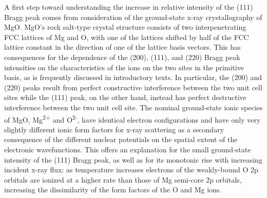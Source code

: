 A first step toward understanding the increase in relative intensity of
the (111) Bragg peak comes from consideration of the ground-state x-ray
crystallography of MgO. MgO's rock salt-type crystal structure consists
of two interpenetrating FCC lattices of Mg and O, with one of the
lattices shifted by half of the FCC lattice constant in the direction of
one of the lattice basis vectors. This has consequences for the
dependence of the (200), (111), and (220) Bragg peak intensities on the
characteristics of the ions on the two sites in the primitive basis, as
is frequently discussed in introductory texts. \cite{KITTEL2005INTRODUCTION} In particular,
the (200) and (220) peaks result from perfect constructive interference
between the two unit cell sites while the (111) peak, on the other hand,
instead has perfect destructive interference between the two unit cell
site. The nominal ground-state ionic species of MgO,
Mg\textsuperscript{2+} and O\textsuperscript{2-}, have identical
electron configurations and have only very slightly different ionic form
factors for x-ray scattering as a secondary consequence of the different
nuclear potentials on the spatial extent of the electronic
wavefunctions. This offers an explanation for the small ground-state
intensity of the (111) Bragg peak, as well as for its monotonic rise
with increasing incident x-ray flux: as temperature increases electrons
of the weakly-bound O 2p orbitals are ionized at a higher rate than
those of Mg semi-core 2p orbitals, increasing the dissimilarity of the
form factors of the O and Mg ions.

